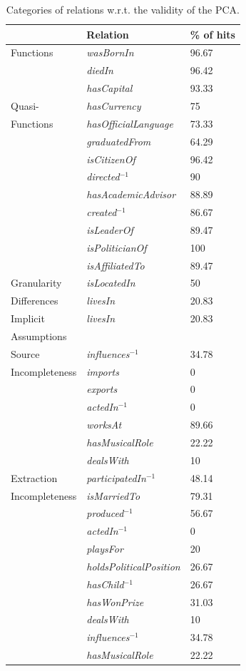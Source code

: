 \begin{table}[t]
\begin{tabular}{p{2.3cm}|p{3cm}| p{2cm}}
\centering{Category}	& Relation 			& \% of hits	\\
\hline
Functions   		&\emph{wasBornIn} 		& 96.67\\
			&\emph{diedIn} 			& 96.42\\
			&\emph{hasCapital}		& 93.33\\
\hline
Quasi- 			&\emph{hasCurrency}		& 75\\
Functions		&\emph{hasOfficialLanguage} 	& 73.33\\
			&\emph{graduatedFrom} 		& 64.29\\
			&\emph{isCitizenOf} 		& 96.42\\
			&\emph{directed}$^{-1}$ 	& 90\\
			&\emph{hasAcademicAdvisor} 	& 88.89\\
			&\emph{created}$^{-1}$  	& 86.67\\
			&\emph{isLeaderOf} 		& 89.47\\
			&\emph{isPoliticianOf}		& 100\\
			&\emph{isAffiliatedTo}		& 89.47\\
\hline
Granularity 		&\emph{isLocatedIn}		& 50\\
Differences		&\emph{livesIn}			& 20.83\\
\hline
Implicit 		&\emph{livesIn} 		& 20.83\\
Assumptions		&&\\
\hline
Source  		&\emph{influences}$^{-1}$	& 34.78\\
Incompleteness		&\emph{imports}			& 0\\
			&\emph{exports}			& 0\\
			&\emph{actedIn}$^{-1}$		& 0\\
			&\emph{worksAt}			& 89.66\\
			&\emph{hasMusicalRole}		& 22.22\\
			&\emph{dealsWith}		& 10\\
\hline
Extraction 		&\emph{participatedIn}$^{-1}$	& 48.14\\
Incompleteness		&\emph{isMarriedTo}		& 79.31\\
			&\emph{produced}$^{-1}$		& 56.67\\
			&\emph{actedIn}$^{-1}$		& 0\\
			&\emph{playsFor}		& 20\\
			&\emph{holdsPoliticalPosition}	& 26.67\\
			&\emph{hasChild}$^{-1}$		& 26.67\\
			&\emph{hasWonPrize}		& 31.03\\
			&\emph{dealsWith}		& 10\\
			&\emph{influences}$^{-1}$	& 34.78\\
			&\emph{hasMusicalRole} 		& 22.22\\
\end{tabular}
\caption{Categories of relations w.r.t. the validity of the PCA.}
\label{PCA_assumption_entities}
\end{table}
